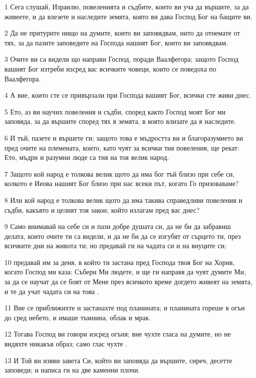 \par 1 Сега слушай, Израилю, повеленията и съдбите, които ви уча да вършите, за да живеете, и да влезете и наследите земята, която ви дава Господ Бог на бащите ви.
\par 2 Да не притурите нищо на думите, които ви заповядвам, нито да отнемате от тях, за да пазите заповедите на Господа нашият Бог, които ви заповядвам.
\par 3 Очите ви са видели що направи Господ, поради Ваалфегора; защото Господ вашият Бог изтреби изсред вас всичките човеци, които се поведоха по Ваалфегора.
\par 4 А вие, които сте се привързали при Господа вашият Бог, всички сте живи днес.
\par 5 Ето, аз ви научих повеления и съдби, според както Господ моят Бог ми заповяда, за да вършите според тях в земята, в която влизате да я наследите.
\par 6 И тъй, пазете и вършете ги; защото това е мъдростта ви и благоразумието ви пред очите на племената, които, като чуят за всички тия повеления, ще рекат: Ето, мъдри и разумни люде са тия на тоя велик народ.
\par 7 Защото кой народ е толкова велик щото да има бог тъй близо при себе си, колкото е Иеова нашият Бог близо при нас всеки път, когато Го призоваваме?
\par 8 Или кой народ е толкова велик щото да има такива справедливи повеления и съдби, какъвто и целият тоя закон, който излагам пред вас днес?
\par 9 Само внимавай на себе си и пази добре душата си, да не би да забравиш делата, които очите ти са видели, и да не би да се изгубят от сърцето ти, през всичките дни на живота ти; но предавай ги на чадата си и на внуците си;
\par 10 предавай им за деня, в който ти застана пред Господа твоя Бог на Хорив, когато Господ ми каза: Събери Ми людете, и ще ги направя да чуят думите Ми, за да се научат да се боят от Мене през всичкото време догдето живеят на земята, и те да учат чадата си на това .
\par 11 Вие се приближихте и застанахте под планината; и планината гореше в огън до сред небето, и имаше тъмнина, облак и мрак.
\par 12 Тогава Господ ви говори изсред огъня; вие чухте гласа на думите, но не видяхте никакъв образ; само глас чухте .
\par 13 И Той ви изяви завета Си, който ви заповяда да вършите, сиреч, десетте заповеди; и написа ги на две каменни плочи.
